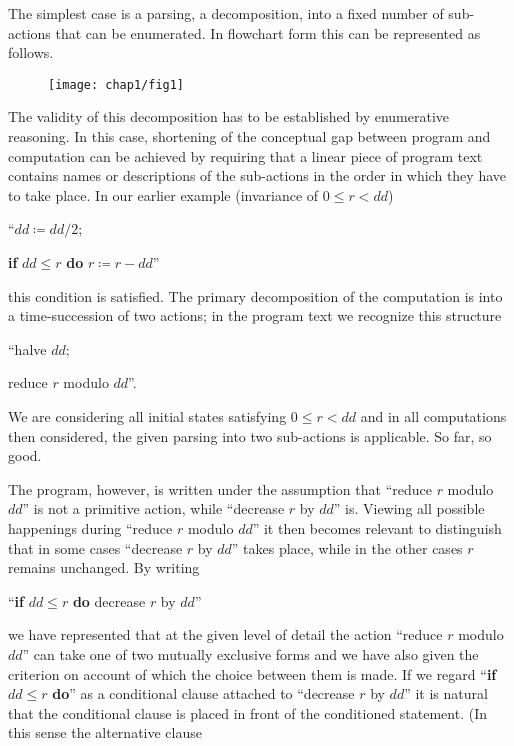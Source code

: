 The simplest case is a parsing, a decomposition, into a fixed number of sub-actions that can be enumerated. In flowchart form this can be represented as follows. 

\begin{figure}[h]
	\centering
	\texttt{[image: chap1/fig1]}
\end{figure}

The validity of this decomposition has to be established by enumerative reasoning. In this case, shortening of the conceptual gap between program and computation can be achieved by requiring that a linear piece of program text contains names or descriptions of the sub-actions in the order in which they have to take place. In our earlier example (invariance of $0 \leqslant r < dd$)
\medskip

{
	\setlength{\parindent}{8em}
	\hspace{-.4em}``$dd \coloneq dd/2;$
	
	\textbf{if} $dd \leqslant r$ \textbf{do} $r \coloneq r - dd$''
}
\medskip

\noindent
this condition is satisfied. The primary decomposition of the computation is into a time-succession of two actions; in the program text we recognize this structure
\medskip

{
	\setlength{\parindent}{8em}
	\hspace{-.4em}``halve $dd;$
	
	reduce $r$ modulo $dd$''.
}
\medskip

We are considering all initial states satisfying $0 \leqslant r < dd$ and in all computations then considered, the given parsing into two sub-actions is applicable. So far, so good.

The program, however, is written under the assumption that ``reduce $r$ modulo $dd$'' is not a primitive action, while ``decrease $r$ by $dd$'' is. Viewing all possible happenings during ``reduce $r$ modulo $dd$'' it then becomes relevant to distinguish that in some cases ``decrease $r$ by $dd$'' takes place, while in the other cases $r$ remains unchanged. By writing
\medskip

{
	\setlength{\parindent}{8em}
	\hspace{-.4em}``\textbf{if} $dd \leqslant r$ \textbf{do} decrease $r$ by $dd$''
}
\medskip

\noindent
we have represented that at the given level of detail the action ``reduce $r$ modulo $dd$'' can take one of two mutually exclusive forms and we have also given the criterion on account of which the choice between them is made. If we regard ``\textbf{if} $dd \leqslant r$ \textbf{do}'' as a conditional clause attached to ``decrease $r$ by $dd$'' it is natural that the conditional clause is placed in front of the conditioned statement. (In this sense the alternative clause
\medskip

